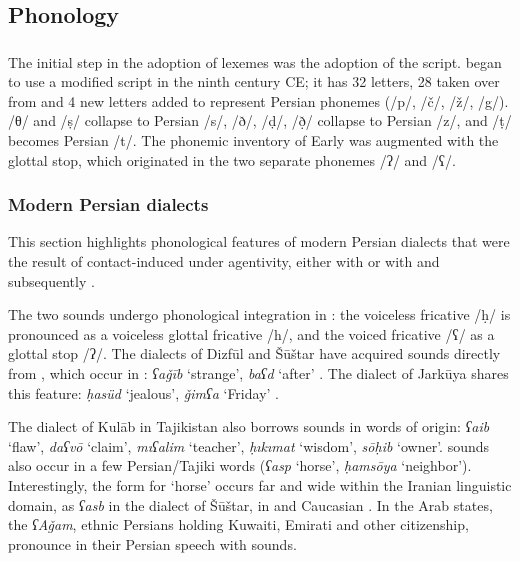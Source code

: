 \documentclass[output=paper]{langsci/langscibook}
\begin{document}
\subsection{Phonology}


\subsubsection{}

The initial step in the adoption of  lexemes was the adoption of the  script.  began to use a modified  script in the ninth century CE; it has 32 letters, 28 taken over from  and 4 new letters added to represent Persian phonemes (/p/, /č/, /ž/, /g/).  /θ/ and /ṣ/ collapse to Persian /s/,  /ð/, /ḍ/, /ð̣/ collapse to Persian /z/, and  /ṭ/ becomes Persian /t/. The phonemic inventory of Early  was augmented with the glottal stop, which originated in the two separate  phonemes /ʔ/ and /ʕ/.

\subsubsection{Modern Persian dialects}

This section highlights phonological features of modern Persian dialects that were the result of contact-induced  under  agentivity, either with  or with  and subsequently .


The two   sounds undergo phonological integration in : the voiceless  fricative /ḥ/ is pronounced as a voiceless glottal fricative /h/, and the voiced  fricative /ʕ/ as a glottal stop /ʔ/. The dialects of Dizfūl and Šūštar have acquired  sounds directly from , which occur in  : \textit{ʕaǧīb} ‘strange’, \textit{baʕd} ‘after’ \citep{MacKinnon2015}. The dialect of Jarkūya shares this feature: \textit{ḥasüd} ‘jealous’, \textit{ǧimʕa} ‘Friday’ \citep{Borjian2008}.

The dialect of Kulāb in Tajikistan also borrows   sounds in words of  origin: \textit{ʕaib} ‘flaw’, \textit{daʕvō} ‘claim’, \textit{mıʕalim} ‘teacher’, \textit{ḥıkımat} ‘wisdom’, \textit{sōḥib} ‘owner’.   sounds also occur in a few Persian/Tajiki words (\textit{ʕasp} ‘horse’, \textit{ḥamsōya} ‘neighbor’). Interestingly, the  form for ‘horse’ occurs far and wide within the Iranian linguistic domain, as \textit{ʕasb} in the  dialect of Šūštar, in  and Caucasian . In the Arab  states, the \textit{ʕAǧam}, ethnic Persians holding Kuwaiti, Emirati and other  citizenship, pronounce   in their Persian speech with  sounds.
\end{document}
